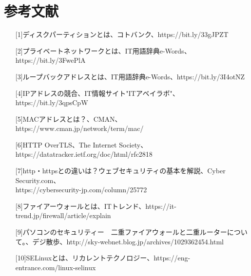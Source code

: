 \documentclass[12pt,a4paper]{jsarticle}
\numberwithin{equation}{section}
\numberwithin{figure}{section}
\numberwithin{table}{section}
\begin{document}
\section{参考文献}
\begin{itemize}
  \item [][1]ディスクパーティションとは、コトバンク、https://bit.ly/33gJPZT
  \item [][2]プライベートネットワークとは、IT用語辞典e-Words、https://bit.ly/3FwePlA
  \item [][3]ループバックアドレスとは、IT用語辞典e-Words、https://bit.ly/3I4otNZ
  \item [][4]IPアドレスの競合、IT情報サイト"ITアベイラボ"、https://bit.ly/3qpsCpW
  \item [][5]MACアドレスとは？、CMAN、https://www.cman.jp/network/term/mac/
  \item [][6]HTTP OverTLS、The Internet Society、https://datatracker.ietf.org/doc/html/rfc2818
  \item [][7]http・httpsとの違いは？ウェブセキュリティの基本を解説、Cyber Security.com、\\https://cybersecurity-jp.com/column/25772
  \item [][8]ファイアーウォールとは、ITトレンド、https://it-trend.jp/firewall/article/explain
  \item [][9]パソコンのセキュリティー　二重ファイアウォールと二重ルーターについて。、デジ散歩、http://sky-webnet.blog.jp/archives/1029362454.html
  \item [][10]SELinuxとは、リカレントテクノロジー、https://eng-entrance.com/linux-selinux
\end{itemize}
\end{document}
